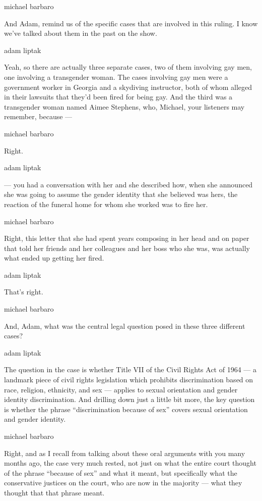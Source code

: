 michael barbaro

And Adam, remind us of the specific cases that are involved in this
ruling. I know we've talked about them in the past on the show.

adam liptak

Yeah, so there are actually three separate cases, two of them involving
gay men, one involving a transgender woman. The cases involving gay men
were a government worker in Georgia and a skydiving instructor, both of
whom alleged in their lawsuits that they'd been fired for being gay. And
the third was a transgender woman named Aimee Stephens, who, Michael,
your listeners may remember, because ---

michael barbaro

Right.

adam liptak

--- you had a conversation with her and she described how, when she
announced she was going to assume the gender identity that she believed
was hers, the reaction of the funeral home for whom she worked was to
fire her.

michael barbaro

Right, this letter that she had spent years composing in her head and on
paper that told her friends and her colleagues and her boss who she was,
was actually what ended up getting her fired.

adam liptak

That's right.

michael barbaro

And, Adam, what was the central legal question posed in these three
different cases?

adam liptak

The question in the case is whether Title VII of the Civil Rights Act of
1964 --- a landmark piece of civil rights legislation which prohibits
discrimination based on race, religion, ethnicity, and sex --- applies
to sexual orientation and gender identity discrimination. And drilling
down just a little bit more, the key question is whether the phrase
``discrimination because of sex'' covers sexual orientation and gender
identity.

michael barbaro

Right, and as I recall from talking about these oral arguments with you
many months ago, the case very much rested, not just on what the entire
court thought of the phrase ``because of sex'' and what it meant, but
specifically what the conservative justices on the court, who are now in
the majority --- what they thought that that phrase meant.

